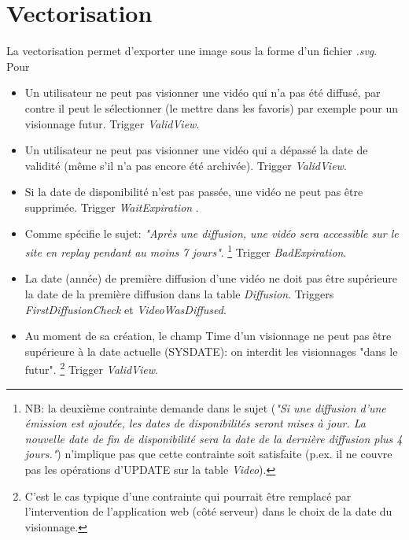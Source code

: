 \documentclass[twoside,openright,a4paper,11pt,french]{article}
\begin{document}
\section{Vectorisation} 
La vectorisation permet d'exporter une image sous la forme d'un
fichier {\it .svg}. Pour 


\begin{itemize}
\item Un utilisateur ne peut pas visionner une vidéo qui n'a pas été diffusé,
par contre il peut le sélectionner (le mettre dans les favoris) par exemple
pour un visionnage futur. Trigger {\it ValidView}.

\item Un utilisateur ne peut pas visionner une vidéo qui a dépassé la date de
validité (même s'il n'a pas encore été archivée). Trigger {\it ValidView}.

\item Si la date de disponibilité n'est pas passée, une vidéo ne peut pas être supprimée. 
      Trigger {\it WaitExpiration }.

\item Comme spécifie le sujet: {\it "Après une diffusion, une vidéo sera
accessible sur le site en replay pendant au moins 7 jours"}. 
\footnote{NB: la deuxième contrainte demande dans le sujet ({\it"Si une diffusion d’une émission est
ajoutée, les dates de disponibilités seront mises à jour.  La nouvelle date de
fin de disponibilité sera la date de la dernière diffusion plus 4 jours."})
n'implique pas que cette contrainte soit satisfaite (p.ex. il ne couvre pas les
opérations d'UPDATE sur la table {\it Video}).} 
Trigger {\it BadExpiration}.

\item La date (année) de première diffusion d'une vidéo ne doit pas être
supérieure la date de la première diffusion dans la table {\it Diffusion}.
Triggers {\it FirstDiffusionCheck} et {\it VideoWasDiffused}.

\item  Au moment de sa création, le champ Time d'un visionnage ne peut pas être
supérieure à la date actuelle (SYSDATE): on interdit les visionnages "dans le
futur".
\footnote{C'est le cas typique d'une contrainte qui pourrait être remplacé par
l'intervention de l'application web (côté serveur) dans le choix de la date du
visionnage.}
Trigger {\it ValidView}.



\end{itemize}

\end{document}
